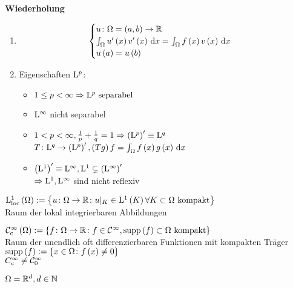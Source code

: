 \textbf{Wiederholung}\\
\begin{enumerate}
\item	
	\begin{equation*}
		\begin{cases}
			u\colon\Omega=\left(a,b\right)\to\mathbb{R}\\
			\int_{\Omega}u^{\prime}\left(x\right)v^{\prime}\left(x\right)\,\mathrm{d}x = \int_{\Omega}f\left(x\right)v\left(x\right)\,\mathrm{d}x\\
			u\left(a\right)=u\left(b\right)
		\end{cases}
	\end{equation*}
\item{}
	Eigenschaften $\mathrm{L}^{p}$:\\
	\begin{itemize}
		\item $1\leq p <\infty \Rightarrow \mathrm{L}^{p}\text{ separabel}$
		\item $\mathrm{L}^{\infty}$ nicht separabel
		\item $1 < p <\infty, \frac{1}{p}+\frac{1}{q}=1 \Rightarrow \left(\mathrm{L}^{p}\right)^{\prime} \equiv \mathrm{L}^{q}$\\
			  $T\colon \mathrm{L}^{q}\to\left(\mathrm{L}^{p}\right)^{\prime}, \left(Tg\right)f = \int_{\Omega}f\left(x\right)g\left(x\right)\,\mathrm{d}x$
		\item $\left(\mathrm{L}^{1}\right)^{\prime}\equiv\mathrm{L}^{\infty}, \mathrm{L}^{1}\subsetneq\left(\mathrm{L}^{\infty}\right)^{\prime}$\\
				$\Rightarrow \mathrm{L}^{1}, \mathrm{L}^{\infty}$ sind nicht reflexiv
	\end{itemize}
\end{enumerate}

\begin{definition}
	$\mathrm{L}^{1}_{\text{loc}}\left(\Omega\right) := \left\{u\colon\Omega\to\mathbb{R}\colon u|_{K}\in\mathrm{L}^{1}\left(K\right)\forall K\subset\Omega \text{ kompakt}\right\}$\\
	Raum der lokal integrierbaren Abbildungen
\end{definition}

\begin{definition}
	$\mathcal{C}^{\infty}_{\text{c}}\left(\Omega\right) := \left\{f\colon\Omega\to\mathbb{R}\colon f\in\mathcal{C}^{\infty},\operatorname{supp}\left(f\right)\subset\Omega\text{ kompakt}\right\}$\\
	Raum der unendlich oft differenzierbaren Funktionen mit kompakten Träger\\
	$\operatorname{supp}\left(f\right):=\left\{x\in\Omega\colon f\left(x\right)\neq 0\right\}$\\
	\boldmath$C^{\infty}_{\text{c}}\neq \mathcal{C}^{\infty}_{0}$
\end{definition}

\begin{expl}
	$\Omega=\mathbb{R}^{d},d\in\mathbb{N}$
\end{expl}
